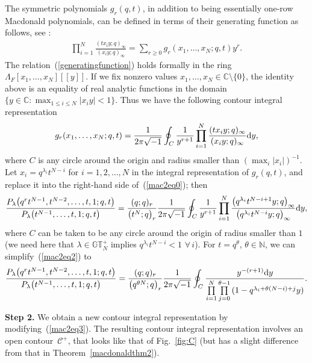 \documentclass[pdftex]{sigma}
\numberwithin{equation}{section}
\newcommand{\C}{\mathbb{C}}
\newcommand{\N}{\mathbb{N}}
\newcommand{\CC}{\mathcal{C}}
\newcommand{\GTp}{\mathbb{GT}^+}
\begin{document}
The symmetric polynomials $g_r(q, t)$, in addition to being essentially one-row Macdonald polynomials, can be def\/ined in terms of their generating function as follows, see \cite[Chapter~VI]{M2}:
\begin{gather}\label{generatingfunction}
\prod_{i=1}^N{\frac{(tx_iy; q)_{\infty}}{(x_iy; q)_{\infty}}} = \sum_{r\geq 0}g_r(x_1, \dots, x_N; q, t)y^r.
\end{gather}
The relation~(\ref{generatingfunction}) holds formally in the ring $\Lambda_F[x_1, \dots, x_N][[y]]$. If we f\/ix nonzero values $x_1, \dots, x_N\in\C\setminus\{0\}$, the identity above is an equality of real analytic functions in the domain $\{y\in\C \colon \max_{1\leq i\leq N}{|x_i y|} < 1\}$. Thus we have the following contour integral representation
\begin{gather*}
g_r(x_1, \dots, x_N; q, t) = \frac{1}{2\pi\sqrt{-1}}\oint_C{\frac{1}{y^{r+1}}\prod_{i=1}^N{\frac{(tx_iy; q)_{\infty}}{(x_iy; q)_{\infty}}{\rm d}y}},
\end{gather*}
where $C$ is any circle around the origin and radius smaller than $(\max_i{|x_i|})^{-1}$. Let $x_i = q^{\lambda_i}t^{N-i}$ for $i = 1, 2, \dots, N$ in the integral representation of $g_r(q, t)$, and replace it into the right-hand side of~(\ref{mac2eq0}); then
\begin{gather}\label{mac2eq2}
\frac{P_{\lambda}\big(q^rt^{N-1}, t^{N-2}, \dots, t, 1; q, t\big)}{P_{\lambda}\big(t^{N-1}, \dots, t, 1; q, t\big)} = \frac{(q; q)_r}{\big(t^N; q\big)_r}\frac{1}{2\pi\sqrt{-1}}\oint_C{\frac{1}{y^{r+1}}\prod_{i=1}^N{\frac{\big(q^{\lambda_i}t^{N-i+1}y; q\big)_{\infty}}{\big(q^{\lambda_i}t^{N-i}y; q\big)_{\infty}}{\rm d}y}},
\end{gather}
where $C$ can be taken to be any circle around the origin of radius smaller than $1$ (we need here that $\lambda\in\GTp_N$ implies $q^{\lambda_i}t^{N-i} < 1$ $\forall\, i$). For $t = q^{\theta}$, $\theta\in\N$, we can simplify~(\ref{mac2eq2}) to
\begin{gather}\label{mac2eq3}
\frac{P_{\lambda}\big(q^rt^{N-1}, t^{N-2}, \dots, t, 1; q, t\big)}{P_{\lambda}\big(t^{N-1}, \dots, t, 1; q, t\big)} = \frac{(q; q)_r}{\big(q^{\theta N}; q\big)_r}\frac{1}{2\pi\sqrt{-1}}\oint_C
{\frac{y^{-(r+1)} {\rm d}y}{\prod\limits_{i=1}^N{\prod\limits_{j=0}^{\theta-1}{(1 - q^{\lambda_i + \theta(N - i) + j}y)}}}}.
\end{gather}

\textbf{Step 2.} We obtain a new contour integral representation by modifying~(\ref{mac2eq3}). The resulting contour integral representation involves an open contour~$\CC^+$, that looks like that of Fig.~\ref{fig:C} (but has a slight dif\/ference from that in Theorem~\ref{macdonaldthm2}).
\end{document}
